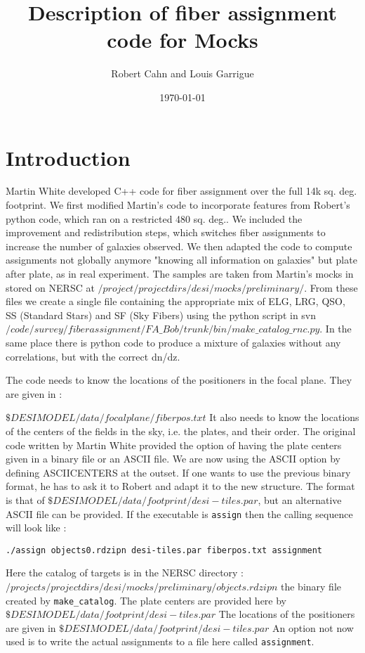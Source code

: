 \documentclass{article}
\title{Description of fiber assignment code for Mocks}
\author{Robert Cahn and Louis Garrigue}
\date{\today}
\begin{document}
\maketitle

\section{Introduction}

Martin White developed C++ code for fiber assignment over the full 14k sq. deg. footprint.  We first modified Martin's code to incorporate features from Robert's python code, which ran on a restricted 480 sq. deg.. We included the improvement and redistribution steps, which switches fiber assignments to increase the number of galaxies observed. We then adapted the code to compute assignments not globally anymore "knowing all information on galaxies" but plate after plate, as in real experiment.
The samples are taken from Martin's mocks in stored on NERSC at $/project/projectdirs/desi/mocks/preliminary/$.  From these files we create a single file containing the appropriate mix of ELG, LRG, QSO, SS (Standard Stars) and SF (Sky Fibers) using the python script in svn $/code/survey/fiberassignment/FA\_Bob/trunk/bin/make\_catalog\_rnc.py$.  In the same place there is python code to produce a mixture of galaxies without any correlations, but with the correct dn/dz.  
  
  The code needs to know the locations of the positioners in the focal plane.  They are given in :
  
  $ \$DESIMODEL/data/focalplane/fiberpos.txt$
  It also needs to know the locations of the centers of the fields in the sky, i.e. the plates, and their order.  The original code written by Martin White provided the option of having the plate centers given in a binary file or an ASCII file.  We are now using the ASCII option by defining ASCIICENTERS at the outset.  If one wants to use the previous binary format, he has to ask it to Robert and adapt it to the new structure. The format is that of $\$DESIMODEL/data/footprint/desi-tiles.par$, but an alternative ASCII file can be provided. If the executable is {\tt assign} then the calling sequence will look like :
  
  {\tt./assign objects0.rdzipn desi-tiles.par fiberpos.txt assignment}
 
 Here the catalog of targets is in the NERSC directory :
  $/projects/projectdirs/desi/mocks/preliminary/objects.rdzipn$ the binary file created by {\tt make\_catalog}.  The plate centers are provided here by  $\$DESIMODEL/data/footprint/desi-tiles.par$    The locations of the positioners are given in $ \$DESIMODEL/data/footprint/desi-tiles.par$  An option not now used is to write the actual assignments to a file here called {\tt assignment}.
  
\end{document}
